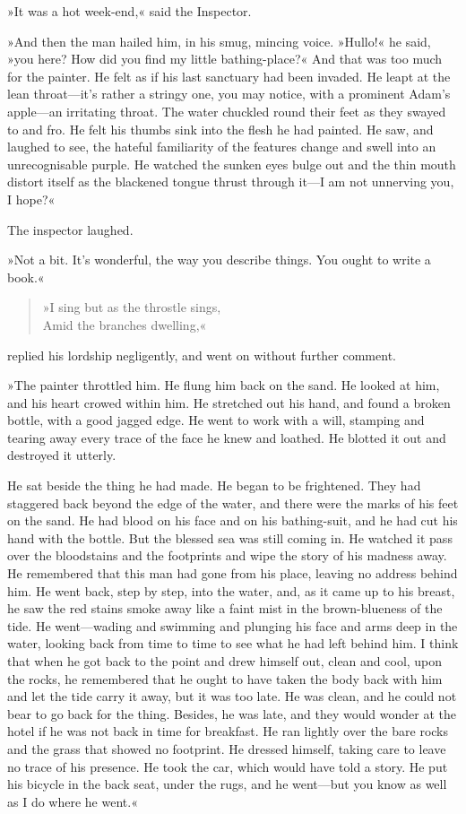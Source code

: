 »It was a hot week-end,« said the Inspector.

»And then the man hailed him, in his smug, mincing voice. »Hullo!« he said, »you here? How did you find my little bathing-place?« And that was too much for the painter. He felt as if his last sanctuary had been invaded. He leapt at the lean throat—it's rather a stringy one, you may notice, with a prominent Adam's apple—an irritating throat. The water chuckled round their feet as they swayed to and fro. He felt his thumbs sink into the flesh he had painted. He saw, and laughed to see, the hateful familiarity of the features change and swell into an unrecognisable purple. He watched the sunken eyes bulge out and the thin mouth distort itself as the blackened tongue thrust through it—I am not unnerving you, I hope?«

The inspector laughed.

»Not a bit. It's wonderful, the way you describe things. You ought to write a book.«

\begin{quote}
»I sing but as the throstle sings,\\
Amid the branches dwelling,«
\end{quote}
\indent replied his lordship negligently, and went on without further comment.

»The painter throttled him. He flung him back on the sand. He looked at him, and his heart crowed within him. He stretched out his hand, and found a broken bottle, with a good jagged edge. He went to work with a will, stamping and tearing away every trace of the face he knew and loathed. He blotted it out and destroyed it utterly.

He sat beside the thing he had made. He began to be frightened. They had staggered back beyond the edge of the water, and there were the marks of his feet on the sand. He had blood on his face and on his bathing-suit, and he had cut his hand with the bottle. But the blessed sea was still coming in. He watched it pass over the bloodstains and the footprints and wipe the story of his madness away. He remembered that this man had gone from his place, leaving no address behind him. He went back, step by step, into the water, and, as it came up to his breast, he saw the red stains smoke away like a faint mist in the brown-blueness of the tide. He went—wading and swimming and plunging his face and arms deep in the water, looking back from time to time to see what he had left behind him. I think that when he got back to the point and drew himself out, clean and cool, upon the rocks, he remembered that he ought to have taken the body back with him and let the tide carry it away, but it was too late. He was clean, and he could not bear to go back for the thing. Besides, he was late, and they would wonder at the hotel if he was not back in time for breakfast. He ran lightly over the bare rocks and the grass that showed no footprint. He dressed himself, taking care to leave no trace of his presence. He took the car, which would have told a story. He put his bicycle in the back seat, under the rugs, and he went—but you know as well as I do where he went.«

